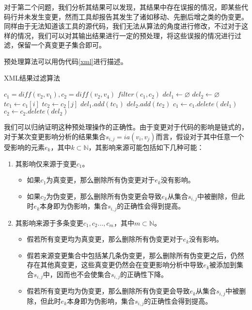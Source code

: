 对于第二个问题，我们分析其结果可以发现，其结果中存在误报的情况，即某些代码行并未发生变更，然而工具却报告其发生了诸如移动、先删后增之类的伪变更。同样由于无法知道该工具的源代码，我们无法从算法的角度进行修改，不过对于这样的情况，我们可以对其输出结果进行一定的预处理，将这些误报的情况进行过滤，保留一个真变更子集合即可。

预处理算法可以用伪代码\ref {xml}进行描述。

\begin{algorithm}
	\caption{XML结果过滤算法}
	\label{xml}
	\begin{algorithmic}[1]
		  \REQUIRE $c_1 = diff(v_2, v_1), c_2 = diff(v_2,v_4)$
		  \ENSURE $filter(c_1, c_2)$
		  \STATE $del_1 \gets \varnothing$
		  \STATE $del_2 \gets \varnothing$
			  \STATE $tc_1 \gets c_1[i]$
				  \STATE $tc_2 \gets c_2[j]$
					  \STATE $del_1.add(tc_1)$
					  \STATE $del_2.add(tc_2)$
				  \ENDIF	
			  \ENDFOR
		 \ENDFOR
		 \STATE $c_1 \gets c_1.delete(del_1)$
		 \STATE $c_2 \gets c_2.delete(del_2)$
	\end{algorithmic}
\end{algorithm}

我们可以归纳证明这种预处理操作的正确性。由于变更对于代码的影响是链式的，对于某次变更影响分析的结果集合$s_{i,j} = ia(v_i,v_j)$而言，假设对于其中任意一个受影响的元素$e_k$，其中$k \subset \mathbb{N}$，其影响来源可能包括如下几种可能：
\begin{enumerate}
	\item 其影响仅来源于变更$c_1$。
		\begin{itemize}
			\item 如果$c_1$为真变更，那么删除所有伪变更对于$e_k$没有影响。
			\item 如果$c_2$为伪变更，那么删除所有伪变更会导致$e_k$从集合$s_{i,j}$中被删除，但此时$e_k$本身即为伪影响，集合$s_{i,j}$的正确性会得到提高。
		\end{itemize}
	\item 其影响来源于多条变更$c_1,c_2\dots,c_m$，其中$m \subset \mathbb{N}$。
		\begin{itemize}
			\item 假若所有变更均为真变更，那么删除所有伪变更对于$e_k$没有影响。
			\item 假若来源变更集合中包括某几条伪变更，那么删除所有伪变更之后，仍然存在其他真变更，这些真变更仍然会在变更影响分析中导致$e_k$被添加到集合$s_{i,j}$中，因而也不会使集合$s_{i,j}$的正确性下降。
			\item 假若所有变更均为伪变更，那么删除所有伪变更会导致$e_k$从集合$s_{i,j}$中被删除，但此时$e_k$本身即为伪影响，集合$s_{i,j}$的正确性会得到提高。
		\end{itemize}
\end{enumerate}

